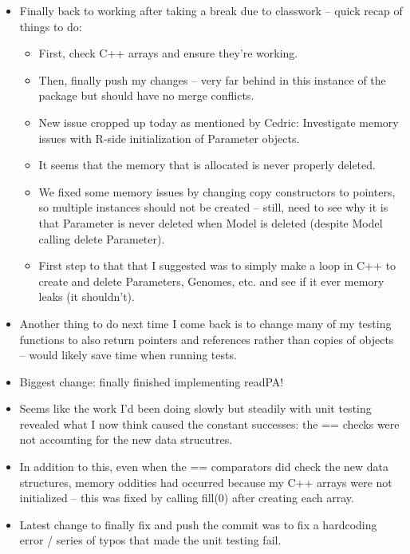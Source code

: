 \documentclass[12pt,hyperref]{labbook}
\begin{document}
\begin{itemize}
    \item Finally back to working after taking a break due to classwork -- quick recap of things to do:
    \begin{itemize}
        \item First, check C++ arrays and ensure they're working.
        \item Then, finally push my changes -- very far behind in this instance of the package but should have no merge conflicts.
        \item New issue cropped up today as mentioned by Cedric: Investigate memory issues with R-side initialization of Parameter objects.
        \item It seems that the memory that is allocated is never properly deleted.
        \item We fixed some memory issues by changing copy constructors to pointers, so multiple instances should not be created -- still, need to see why it is that Parameter is never deleted when Model is deleted (despite Model calling delete Parameter).
        \item First step to that that I suggested was to simply make a loop in C++ to create and delete Parameters, Genomes, etc. and see if it ever memory leaks (it shouldn't).
    \end{itemize}
    \item Another thing to do next time I come back is to change many of my testing functions to also return pointers and references rather than copies of objects -- would likely save time when running tests.
    \item Biggest change: finally finished implementing readPA!
    \item Seems like the work I'd been doing slowly but steadily with unit testing revealed what I now think caused the constant successes: the == checks were not accounting for the new data strucutres.
    \item In addition to this, even when the == comparators did check the new data structures, memory oddities had occurred because my C++ arrays were not initialized -- this was fixed by calling fill(0) after creating each array.
    \item Latest change to finally fix and push the commit was to fix a hardcoding error / series of typos that made the unit testing fail.
\end{itemize}
\end{document}
